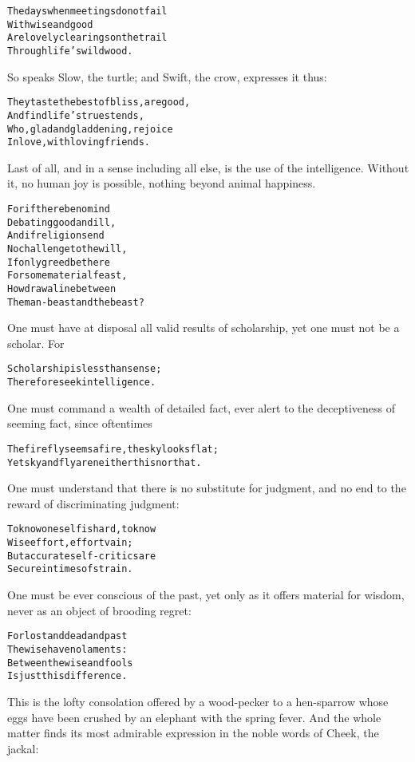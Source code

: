 \documentclass{article}
\renewenvironment{verbatim}{\begin{alltt}\normalfont\begin{centering}}{\end{centering}\end{alltt}}
\begin{document}
\begin{verbatim}
The days when meetings do not fail
    With wise and good
Are lovely clearings on the trail
    Through life's wild wood.
\end{verbatim}
So speaks Slow, the turtle; and Swift, the crow, expresses it
thus:

\begin{verbatim}
They taste the best of bliss, are good,
    And find life's truest ends,
Who, glad and gladdening, rejoice
    In love, with loving friends.
\end{verbatim}
Last of all, and in a sense including all else, is the use of the
intelligence. Without it, no human joy is possible, nothing beyond
animal happiness.

\begin{verbatim}
For if there be no mind
    Debating good and ill,
And if religion send
    No challenge to the will,
If only greed be there
    For some material feast,
How draw a line between
    The man-beast and the beast?
\end{verbatim}
One must have at disposal all valid results of scholarship, yet one
must not be a scholar. For

\begin{verbatim}
Scholarship is less than sense;
Therefore seek intelligence.
\end{verbatim}
One must command a wealth of detailed fact, ever alert to the
deceptiveness of seeming fact, since oftentimes

\begin{verbatim}
The firefly seems a fire, the sky looks flat;
Yet sky and fly are neither this nor that.
\end{verbatim}
One must understand that there is no substitute for judgment, and
no end to the reward of discriminating judgment:

\begin{verbatim}
To know oneself is hard, to know
    Wise effort, effort vain;
But accurate self-critics are
    Secure in times of strain.
\end{verbatim}
One must be ever conscious of the past, yet only as it offers
material for wisdom, never as an object of brooding regret:

\begin{verbatim}
For lost and dead and past
    The wise have no laments:
Between the wise and fools
    Is just this difference.
\end{verbatim}
This is the lofty consolation offered by a wood-pecker to a
hen-sparrow whose eggs have been crushed by an elephant with the
spring fever. And the whole matter finds its most admirable
expression in the noble words of Cheek, the jackal:
\end{document}
